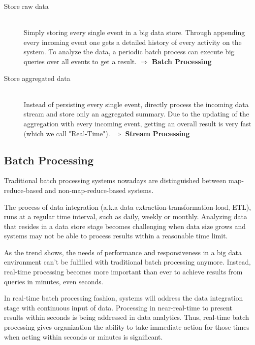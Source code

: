 \begin{description}
    \item[Store raw data]  \hfill \\
    {Simply storing every single event in a big data store. Through appending
    every incoming event one gets a detailed history of every activity on the system.
    To analyze the data, a periodic batch process can execute big queries over
    all events to get a result.  $ \Rightarrow $  \textbf{Batch Processing}}
    \item[Store aggregated data  ] \hfill \\
    {Instead of persisting every single event, directly process the incoming data stream and store
    only an aggregated summary. Due to the updating of the aggregation with every
    incoming event, getting an overall result is very fast (which we call
    "Real-Time"). $ \Rightarrow $ \textbf{Stream Processing}} 
\end{description}
\cite{TalkKleppmann}


\subsection{Batch Processing}
\label{intro-datastream-batchprocessing}
Traditional batch processing systems nowadays are distinguished between
map-reduce-based and non-map-reduce-based systems.

The process of  data integration (a.k.a data extraction-transformation-load, ETL), 
runs at a regular time interval, such as daily, weekly or
monthly. Analyzing data that resides in a data store stage becomes
challenging when data size grows and systems may not be able to process results
within a reasonable time limit. \cite{Liu:2014:SRP:2628194.2628251}

As the trend shows, the needs of performance and responsiveness in a big data
environment can't be fulfilled with traditional batch processing anymore.
Instead, real-time processing becomes more important than ever to achieve
results from queries in minutes, even seconds.
\cite{bange2013big}

In real-time batch processing fashion, systems will address the data integration stage
with continuous input of data. Processing in near-real-time to present 
results within seconds is being addressed in data analytics. Thus,
real-time batch processing gives organization the ability to take immediate action
for those times when acting within seconds or minutes is significant.
\cite{PrpSvyOfDSPS}


